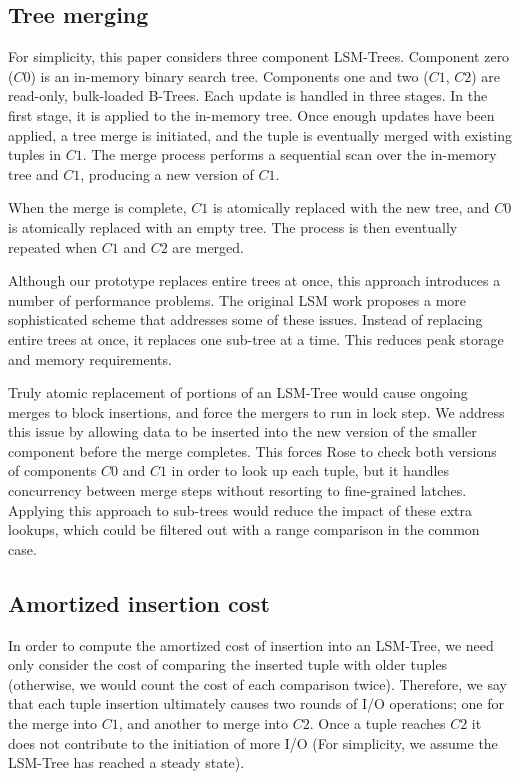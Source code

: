 \documentclass{vldb}
\newcommand{\rows}{Rose\xspace}
\begin{document}
\subsection{Tree merging}
For simplicity,
this paper considers three component LSM-Trees.  Component zero ($C0$)
is an in-memory binary search tree.  Components one and two ($C1$,
$C2$) are read-only, bulk-loaded B-Trees.  
Each update is handled in three stages.  In the first stage,
it is applied to the in-memory tree.  Once enough updates
have been applied, a tree merge is initiated, and the tuple is
eventually merged with existing tuples in $C1$.  The merge process
performs a sequential scan over the in-memory tree and $C1$, producing
a new version of $C1$.

When the merge is complete, $C1$ is atomically replaced
with the new tree, and $C0$ is atomically replaced with an empty tree.
The process is then eventually repeated when $C1$ and $C2$ are merged.

Although our prototype replaces entire trees at once, this approach
introduces a number of performance problems.  The original LSM work
proposes a more sophisticated scheme that addresses some of these
issues.  Instead of replacing entire trees at once, it replaces one
sub-tree at a time.  This reduces peak storage and memory requirements.

Truly atomic replacement of portions of an LSM-Tree would cause ongoing
merges to block insertions, and force the mergers to run in lock step.
We address this issue by allowing data to be inserted into
the new version of the smaller component before the merge completes.
This forces \rows to check both versions of components $C0$ and $C1$
in order to look up each tuple, but it handles concurrency between merge steps
without resorting to fine-grained latches.  Applying this
approach to sub-trees would reduce the impact of these extra lookups,
which could be filtered out with a range comparison in the common
case.

\subsection{Amortized insertion cost}

In order to compute the amortized cost of insertion into an LSM-Tree,
we need only consider the cost of comparing the inserted tuple with
older tuples (otherwise, we would count the cost of each comparison
twice).  Therefore, we say that each tuple insertion ultimately causes
two rounds of I/O operations; one for the merge into $C1$, and another
to merge into $C2$.  Once a tuple reaches $C2$ it does not contribute
to the initiation of more I/O (For simplicity, we assume the LSM-Tree
has reached a steady state).
\end{document}
